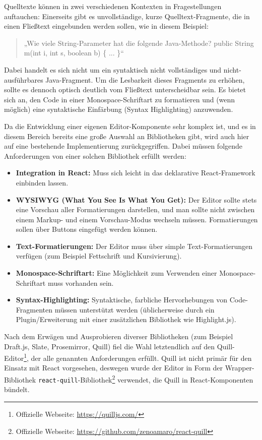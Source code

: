 Quelltexte können in zwei verschiedenen Kontexten in Fragestellungen auftauchen: Einerseits gibt es unvollständige, kurze Quelltext-Fragmente, die in einen Fließtext eingebunden werden sollen, wie in diesem Beispiel:

\begin{quote}
„Wie viele String-Parameter hat die folgende Java-Methode?\newline
public String m(int i, int s, boolean b) \{ ... \}“
\end{quote}

Dabei handelt es sich nicht um ein syntaktisch nicht vollständiges und nicht-ausführbares Java-Fragment. Um die Lesbarkeit dieses Fragments zu erhöhen, sollte es dennoch optisch deutlich vom Fließtext unterscheidbar sein. Es bietet sich an, den Code in einer Monospace-Schriftart zu formatieren und (wenn möglich) eine syntaktische Einfärbung (Syntax Highlighting) anzuwenden.

Da die Entwicklung einer eigenen Editor-Komponente sehr komplex ist, und es in diesem Bereich bereits eine große Auswahl an Bibliotheken gibt, wird auch hier auf eine bestehende Implementierung zurückgegriffen. Dabei müssen folgende Anforderungen von einer solchen Bibliothek erfüllt werden:

\begin{itemize}
    \item \textbf{Integration in React:}  Muss sich leicht in das deklarative React-Framework einbinden lassen.
    \item \textbf{WYSIWYG (What You See Is What You Get):} Der Editor sollte stets eine Vorschau aller Formatierungen darstellen, und man sollte nicht zwischen einem Markup- und einem Vorschau-Modus wechseln müssen. Formatierungen sollen über Buttons eingefügt werden können.
    \item \textbf{Text-Formatierungen:} Der Editor muss über simple Text-Formatierungen verfügen (zum Beispiel Fettschrift und Kursivierung).
    \item \textbf{Monospace-Schriftart:} Eine Möglichkeit zum Verwenden einer Monospace-Schriftart muss vorhanden sein.
    \item \textbf{Syntax-Highlighting:} Syntaktische, farbliche Hervorhebungen von Code-Fragmenten müssen unterstützt werden (üblicherweise durch ein Plugin/Erweiterung mit einer zusätzlichen Bibliothek wie Highlight.js).
\end{itemize}

Nach dem Erwägen und Ausprobieren diverser Bibliotheken (zum Beispiel Draft.js, Slate, Prosemirror, Quill) fiel die Wahl letztendlich auf den Quill-Editor\footnote{Offizielle Webseite: \url{https://quilljs.com/}}, der alle genannten Anforderungen erfüllt. Quill ist nicht primär für den Einsatz mit React vorgesehen, deswegen wurde der Editor in Form der Wrapper-Bibliothek \texttt{react-quill}-Bibliothek\footnote{Offizielle Webseite: \url{https://github.com/zenoamaro/react-quill}} verwendet, die Quill in React-Komponenten bündelt.

